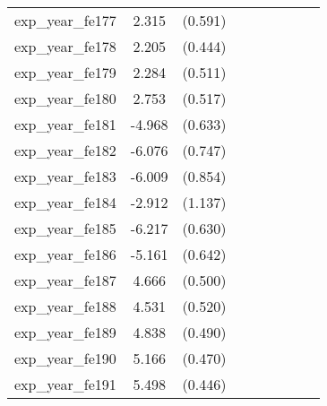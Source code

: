 {\begin{tabular}{l*{4}{cc}}
exp\_year\_fe177&    2.315\sym{***}&  (0.591)&                  &         &                  &         &                  &         \\
exp\_year\_fe178&    2.205\sym{***}&  (0.444)&                  &         &                  &         &                  &         \\
exp\_year\_fe179&    2.284\sym{***}&  (0.511)&                  &         &                  &         &                  &         \\
exp\_year\_fe180&    2.753\sym{***}&  (0.517)&                  &         &                  &         &                  &         \\
exp\_year\_fe181&   -4.968\sym{***}&  (0.633)&                  &         &                  &         &                  &         \\
exp\_year\_fe182&   -6.076\sym{***}&  (0.747)&                  &         &                  &         &                  &         \\
exp\_year\_fe183&   -6.009\sym{***}&  (0.854)&                  &         &                  &         &                  &         \\
exp\_year\_fe184&   -2.912\sym{*}  &  (1.137)&                  &         &                  &         &                  &         \\
exp\_year\_fe185&   -6.217\sym{***}&  (0.630)&                  &         &                  &         &                  &         \\
exp\_year\_fe186&   -5.161\sym{***}&  (0.642)&                  &         &                  &         &                  &         \\
exp\_year\_fe187&    4.666\sym{***}&  (0.500)&                  &         &                  &         &                  &         \\
exp\_year\_fe188&    4.531\sym{***}&  (0.520)&                  &         &                  &         &                  &         \\
exp\_year\_fe189&    4.838\sym{***}&  (0.490)&                  &         &                  &         &                  &         \\
exp\_year\_fe190&    5.166\sym{***}&  (0.470)&                  &         &                  &         &                  &         \\
exp\_year\_fe191&    5.498\sym{***}&  (0.446)&                  &         &                  &         &                  &         \\

\end{tabular}}
